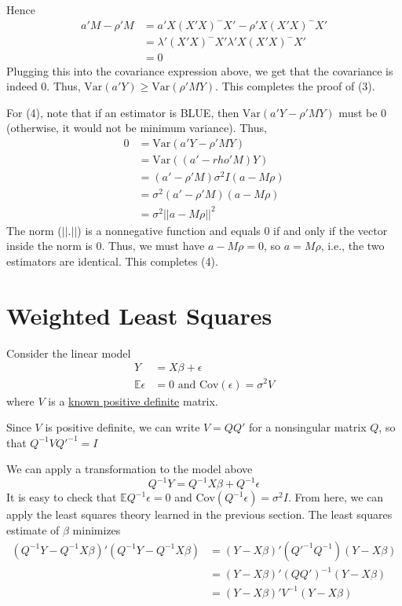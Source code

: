 \documentclass[12pt]{article}
\newcommand{\E}{\mathbb{E}}
\newcommand{\Var}{\mathrm{Var}}
\newcommand{\Cov}{\mathrm{Cov}}
\numberwithin{equation}{section}
\begin{document}
Hence
\begin{align*}
  a'M - \rho'M &= a'X(X'X)^{-}X' - \rho'X(X'X)^{-}X' \\
    &= \lambda'(X'X)^{-}X' \lambda'X(X'X)^{-}X' \\
    &= 0
\end{align*}
Plugging this into the covariance expression above, we get that the covariance is indeed 0. Thus, $\Var(a'Y) \ge \Var(\rho'MY)$. This completes the proof of (3).

For (4), note that if an estimator is BLUE, then $\Var(a'Y - \rho'MY)$ must be 0 (otherwise, it would not be minimum variance). Thus,
%
\begin{align*}
  0 &= \Var(a'Y - \rho' MY) \\
    &= \Var((a' - rho'M)Y) \\
    &= (a' - \rho'M) \sigma^2 I (a - M\rho) \\
    &= \sigma^2 (a' - \rho'M)(a - M\rho) \\
    &= \sigma^2 ||a - M\rho||^2
\end{align*}
%
The norm ($||.||$) is a nonnegative function and equals 0 if and only if the vector inside the norm is 0. Thus, we must have $a - M\rho = 0$, so $a = M\rho$, i.e., the two estimators are identical. This completes (4).

\section{Weighted Least Squares}
Consider the linear model
\begin{align*}
  Y &= X\beta + \epsilon \\
  \E \epsilon &= 0 \text{ and } \Cov(\epsilon) = \sigma^2 V
\end{align*}
where $V$ is a \underline{known positive definite} matrix.

Since $V$ is positive definite, we can write $V = QQ'$ for a nonsingular matrix $Q$, so that $Q^{-1} V Q'^{-1} = I$

We can apply a transformation to the model above
\begin{equation*}
  Q^{-1}Y = Q^{-1} X \beta + Q^{-1} \epsilon
\end{equation*}
It is easy to check that $\E Q^{-1}\epsilon = 0$ and $\Cov(Q^{-1} \epsilon) = \sigma^2 I$. From here, we can apply the least squares theory learned in the previous section. The least squares estimate of $\beta$ minimizes
\begin{align*}
  (Q^{-1}Y - Q^{-1} X \beta)'(Q^{-1} Y - Q^{-1} X \beta)
    &= (Y - X\beta)'(Q'^{-1} Q^{-1})(Y - X\beta) \\
    &= (Y - X\beta)' (Q Q')^{-1} (Y - X\beta) \\
    &= (Y - X\beta)' V^{-1} (Y - X\beta)
\end{align*}
\end{document}
